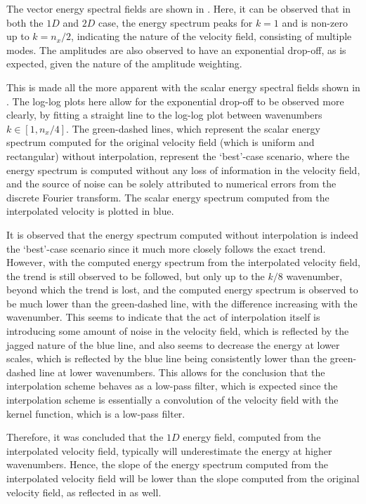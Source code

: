 The vector energy spectral fields are shown in . Here, it can be observed that in both the $1D$ and $2D$ case, the energy spectrum peaks for $k=1$ and is non-zero up to $k=n_x/2$, indicating the nature of the velocity field, consisting of multiple modes. The amplitudes are also observed to have an exponential drop-off, as is expected, given the nature of the amplitude weighting.

This is made all the more apparent with the scalar energy spectral fields shown in . The log-log plots here allow for the exponential drop-off to be observed more clearly, by fitting a straight line to the log-log plot between wavenumbers $k \in [1, n_x/4]$. The green-dashed lines, which represent the scalar energy spectrum computed for the original velocity field (which is uniform and rectangular) without interpolation, represent the `best'-case scenario, where the energy spectrum is computed without any loss of information in the velocity field, and the source of noise can be solely attributed to numerical errors from the discrete Fourier transform. The scalar energy spectrum computed from the interpolated velocity is plotted in blue.

It is observed that the energy spectrum computed without interpolation is indeed the `best'-case scenario since it much more closely follows the exact trend. However, with the computed energy spectrum from the interpolated velocity field, the trend is still observed to be followed, but only up to the $k/8$ wavenumber, beyond which the trend is lost, and the computed energy spectrum is observed to be much lower than the green-dashed line, with the difference increasing with the wavenumber.
This seems to indicate that the act of interpolation itself is introducing some amount of noise in the velocity field, which is reflected by the jagged nature of the blue line, and also seems to decrease the energy at lower scales, which is reflected by the blue line being consistently lower than the green-dashed line at lower wavenumbers. This allows for the conclusion that the interpolation scheme behaves as a low-pass filter, which is expected since the interpolation scheme is essentially a convolution of the velocity field with the kernel function, which is a low-pass filter.

Therefore, it was concluded that the $1D$ energy field, computed from the interpolated velocity field, typically will underestimate the energy at higher wavenumbers. Hence, the slope of the energy spectrum computed from the interpolated velocity field will be lower than the slope computed from the original velocity field, as reflected in  as well.


